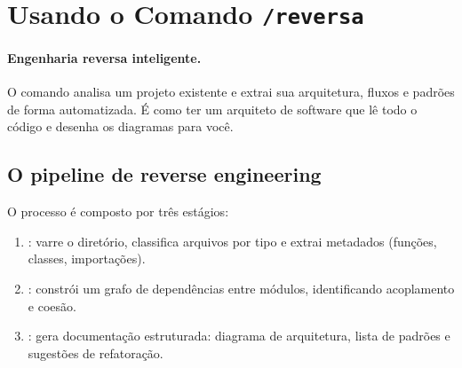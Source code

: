 \section{Usando o Comando \texttt{/reversa}}
\label{sec:reversa}
\nivelavancado

\paragraph{Engenharia reversa inteligente.} O comando 
analisa um projeto existente e extrai sua arquitetura, fluxos e padrões de
forma automatizada. É como ter um arquiteto de software que lê todo o
código e desenha os diagramas para você.

\subsection{O pipeline de reverse engineering}
\label{subsec:pipeline-reversa}

O processo é composto por três estágios:

\begin{enumerate}
\item {}: varre o diretório, classifica arquivos por tipo
      e extrai metadados (funções, classes, importações).
\item {}: constrói um grafo de dependências entre
      módulos, identificando acoplamento e coesão.
\item {}: gera documentação estruturada: diagrama de
      arquitetura, lista de padrões e sugestões de refatoração.
\end{enumerate}

